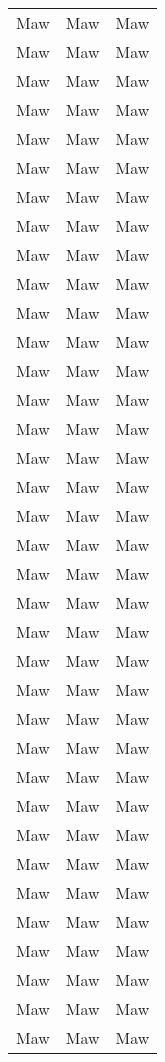 \documentclass[a4, 11pt]{article}
\begin{document}
\begin{longtable}{ l l l }
                Maw & Maw & Maw\\
                Maw & Maw & Maw\\
                Maw & Maw & Maw\\
                Maw & Maw & Maw\\
                Maw & Maw & Maw\\
                Maw & Maw & Maw\\
                Maw & Maw & Maw\\
		Maw & Maw & Maw\\
                Maw & Maw & Maw\\
                Maw & Maw & Maw\\
                Maw & Maw & Maw\\
                Maw & Maw & Maw\\
                Maw & Maw & Maw\\
                Maw & Maw & Maw\\
                Maw & Maw & Maw\\
                Maw & Maw & Maw\\
                Maw & Maw & Maw\\
                Maw & Maw & Maw\\
                Maw & Maw & Maw\\
                Maw & Maw & Maw\\
                Maw & Maw & Maw\\
                Maw & Maw & Maw\\
                Maw & Maw & Maw\\
                Maw & Maw & Maw\\
		Maw & Maw & Maw\\
                Maw & Maw & Maw\\
                Maw & Maw & Maw\\
                Maw & Maw & Maw\\
                Maw & Maw & Maw\\
                Maw & Maw & Maw\\
                Maw & Maw & Maw\\
                Maw & Maw & Maw\\
                Maw & Maw & Maw\\
                Maw & Maw & Maw\\
                Maw & Maw & Maw\\
                Maw & Maw & Maw\\

\end{longtable}
\end{document}
